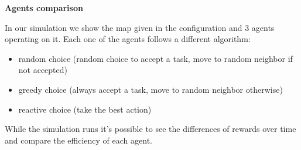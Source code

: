 \documentclass[11pt,a4paper]{article}
\begin{document}
\bigskip
\textbf{Agents comparison}

In our simulation we show the map given in the configuration and 3 agents operating on it. Each one of the agents follows a different algorithm:
\begin{itemize}
\item{random choice (random choice to accept a task, move to random neighbor if not accepted)}
\item{greedy choice (always accept a task, move to random neighbor otherwise)}
\item{reactive choice (take the best action)}
\end{itemize}

While the simulation runs it's possible to see the differences of rewards over time and compare the efficiency of each agent.
\end{document}
